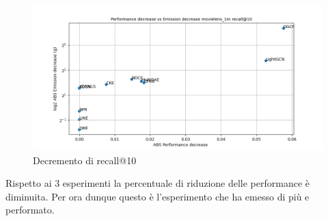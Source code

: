 \begin{figure}[H]
    \centering
     \includegraphics[width=\textwidth]{images/decrement_recall@10_movielens_1m_30_6.png}
    \caption{Decremento di recall@10}
\end{figure}

\noindent Rispetto ai 3 esperimenti la percentuale di riduzione delle performance è diminuita. Per ora dunque questo è l'esperimento che ha emesso di più e performato.

